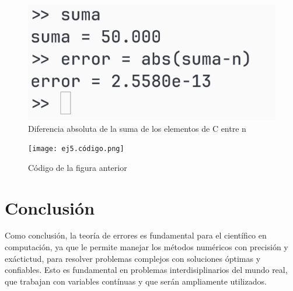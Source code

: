 \documentclass{article}
\begin{document}
\begin{figure}[H]
    \centering
    \includegraphics[width=0.8\linewidth]{ej5.resultados.3.png}
    \caption{Diferencia absoluta de la suma de los elementos de C entre n}
    \label{fig:enter-label}
\end{figure}

\begin{figure}[H]
    \centering
    \texttt{[image: ej5.código.png]}
    \caption{Código de la figura anterior}
    \label{fig:enter-label}
\end{figure}


\section{Conclusión}
Como conclusión, la teoría de errores es fundamental para el científico en computación, ya que le permite manejar los métodos numéricos con precisión y exáctictud, para resolver problemas complejos con soluciones óptimas y confiables. Esto es fundamental en problemas interdisiplinarios del mundo real, que trabajan con variables contínuas y que serán ampliamente utilizados. 
\end{document}
